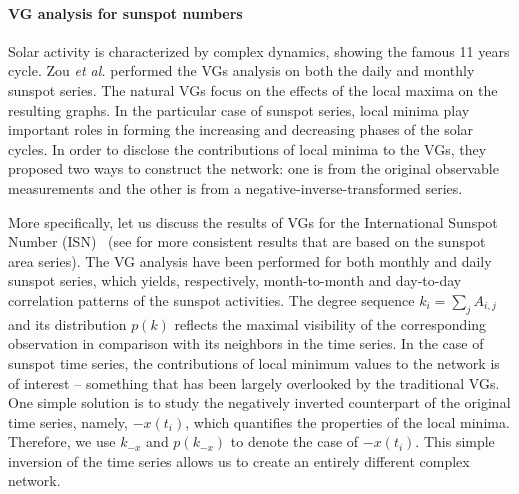 		\paragraph{VG analysis for sunspot numbers} \label{subsec:sunnum}
		Solar activity is characterized by complex dynamics, showing the famous 11 years cycle. Zou {\textit{et al.}} \cite{Zou2014a} performed the VGs analysis on both the daily and monthly sunspot series. The natural VGs focus on the effects of the local maxima on the resulting graphs. In the particular case of sunspot series, local minima play important roles in forming the increasing and decreasing phases of the solar cycles. In order to disclose the contributions of local minima to the VGs, they proposed two ways to construct the network: one is from the original observable measurements and the other is from a negative-inverse-transformed series.

		More specifically, let us discuss the results of VGs for the International Sunspot Number (ISN)~\cite{sidcDataBelgium} (see \cite{Zou2014a} for more consistent results that are based on the sunspot area series). The VG analysis have been performed for both monthly and daily sunspot series, which yields, respectively, month-to-month and day-to-day correlation patterns of the sunspot activities. The degree sequence $k_i = \sum_j A_{i,j}$ and its distribution $p(k)$ reflects the maximal visibility of the corresponding observation in comparison with its neighbors in the time series. In the case of sunspot time series,
the contributions of local minimum values to the network is of interest -- something that has been largely overlooked by the traditional VGs. One simple solution is to study the negatively inverted counterpart of the original time series, namely, $-x(t_i)$, which quantifies the properties of the local minima. Therefore, we use $k_{-x}$ and $p(k_{-x})$ to denote the case of $-x(t_i)$. This simple inversion of the time series allows us to create an entirely different complex network.

